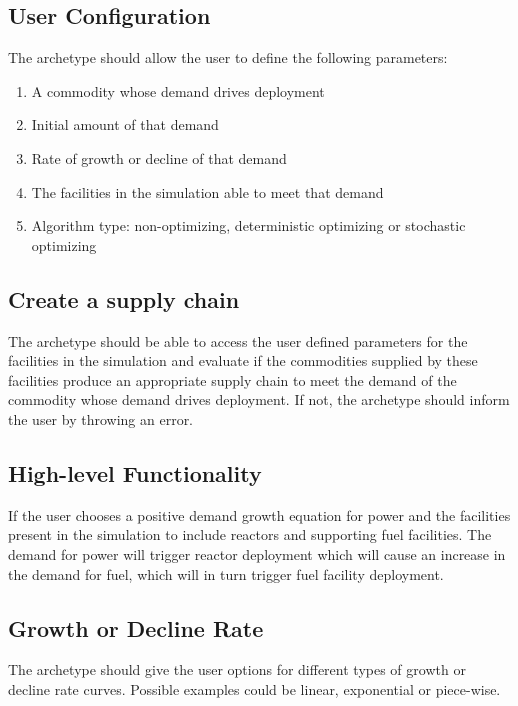 \documentclass[11pt,letterpaper]{article}
\begin{document}
\subsection{User Configuration}
\label{subsection-user}
The archetype should allow the user to define the following parameters: 
\begin{enumerate}
	\item A commodity whose demand drives deployment
	\item Initial amount of that demand
	\item Rate of growth or decline of that demand
	\item The facilities in the simulation able to meet that demand
	\item Algorithm type: non-optimizing, deterministic optimizing or stochastic optimizing
\end{enumerate}

\subsection{Create a supply chain}
\label{subsection-supplychain}
The archetype should be able to access the user defined parameters for the facilities in the simulation and evaluate if the commodities supplied by these facilities produce an appropriate supply chain to meet the demand of the commodity whose demand drives deployment. If not, the archetype should inform the user by throwing an error.  

\subsection{High-level Functionality}
If the user chooses a positive demand growth equation for power and the facilities present in the simulation to include reactors and supporting fuel facilities. The demand for power will trigger reactor deployment which will cause an increase in the demand for fuel, which will in turn trigger fuel facility deployment.

\subsection{Growth or Decline Rate}
\label{subsection-rate}
The archetype should give the user options for different types of growth or decline rate curves. Possible examples could be linear, exponential or piece-wise. 
\end{document}
